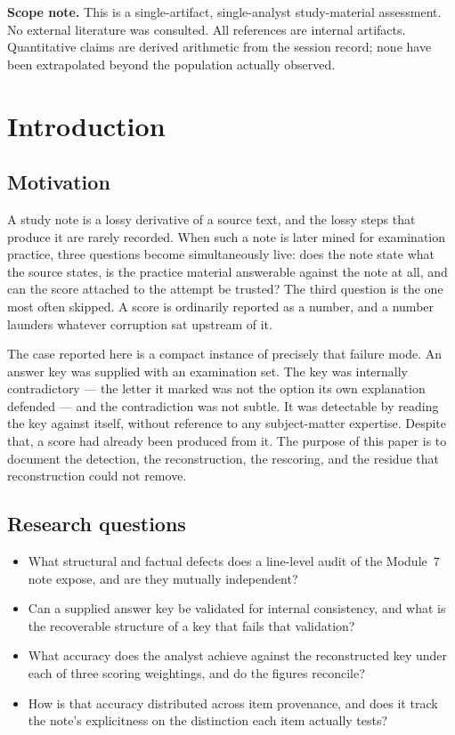 \documentclass[11pt]{article}
\begin{document}
\bigskip
\noindent\textbf{Scope note.} This is a single-artifact, single-analyst
study-material assessment. No external literature was consulted. All
references are internal artifacts. Quantitative claims are derived
arithmetic from the session record; none have been extrapolated beyond the
population actually observed.

\section{Introduction}
\label{sec:intro}

\subsection{Motivation}

A study note is a lossy derivative of a source text, and the lossy steps
that produce it are rarely recorded. When such a note is later mined for
examination practice, three questions become simultaneously live: does the
note state what the source states, is the practice material answerable
against the note at all, and can the score attached to the attempt be
trusted? The third question is the one most often skipped. A score is
ordinarily reported as a number, and a number launders whatever corruption
sat upstream of it.

The case reported here is a compact instance of precisely that failure mode.
An answer key was supplied with an examination set. The key was internally
contradictory --- the letter it marked was not the option its own
explanation defended --- and the contradiction was not subtle. It was
detectable by reading the key against itself, without reference to any
subject-matter expertise. Despite that, a score had already been produced
from it. The purpose of this paper is to document the detection, the
reconstruction, the rescoring, and the residue that reconstruction could not
remove.

\subsection{Research questions}

\begin{itemize}[label={RQ\arabic*.}]
\item What structural and factual defects does a line-level audit of the
      Module~7 note expose, and are they mutually independent?
\item Can a supplied answer key be validated for internal consistency, and
      what is the recoverable structure of a key that fails that
      validation?
\item What accuracy does the analyst achieve against the reconstructed key
      under each of three scoring weightings, and do the figures
      reconcile?
\item How is that accuracy distributed across item provenance, and does it
      track the note's explicitness on the distinction each item actually
      tests?
\end{itemize}
\end{document}
